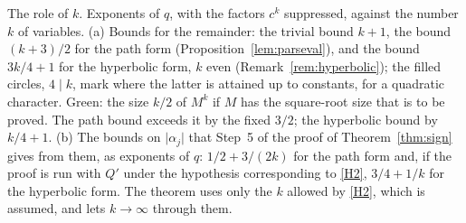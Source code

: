 \caption{The role of $k$. Exponents of $q$, with the factors $c^k$
suppressed, against the number $k$ of variables. (a) Bounds for the
remainder: the trivial bound $k+1$, the bound $(k+3)/2$ for the path form
(Proposition~\ref{lem:parseval}), and the bound $3k/4+1$ for the hyperbolic
form, $k$ even (Remark~\ref{rem:hyperbolic}); the filled circles, $4\mid k$,
mark where the latter is attained up to constants, for a quadratic
character. Green: the size $k/2$ of $M^k$ if $M$ has the square-root size
that is to be proved. The path bound exceeds it by the fixed $3/2$; the
hyperbolic bound by $k/4+1$. (b) The bounds on $\lvert\alpha_j\rvert$ that
Step~5 of the proof of Theorem~\ref{thm:sign} gives from them, as exponents
of $q$: $1/2+3/(2k)$ for the path form and, if the proof is run with $Q'$
under the hypothesis corresponding to \ref{H2}, $3/4+1/k$ for the hyperbolic
form.
The theorem uses only the $k$ allowed by \ref{H2}, which is assumed, and lets
$k\to\infty$ through them.}
\label{fig:k-exponents}
